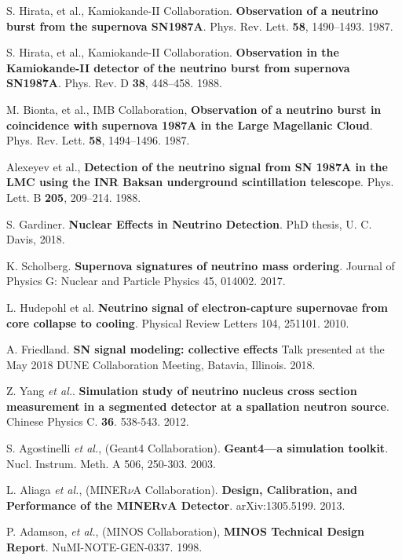  S. Hirata, et al., Kamiokande-II Collaboration. \textbf{Observation of a neutrino burst from the supernova SN1987A}. Phys. Rev. Lett. \textbf{58}, 1490–1493. 1987.

 S. Hirata, et al., Kamiokande-II Collaboration. \textbf{Observation in the Kamiokande-II detector of the neutrino burst from supernova SN1987A}. Phys. Rev. D \textbf{38}, 448–458. 1988.

 M. Bionta, et al., IMB Collaboration, \textbf{Observation of a neutrino burst in coincidence with supernova 1987A in the Large Magellanic Cloud}. Phys. Rev. Lett. \textbf{58}, 1494–1496. 1987. 

 Alexeyev et al., \textbf{Detection of the neutrino signal from SN 1987A in the LMC using the INR Baksan underground scintillation telescope}. Phys. Lett. B \textbf{205}, 209–214. 1988.

 S. Gardiner. \textbf{Nuclear Effects in Neutrino Detection}. PhD thesis,  U. C. Davis, 2018.

 K. Scholberg. \textbf{Supernova signatures of neutrino mass ordering}. Journal of Physics G: Nuclear and Particle Physics 45, 014002. 2017.

 L. Hudepohl et al. \textbf{Neutrino signal of electron-capture supernovae from core collapse to cooling}. Physical Review Letters 104, 251101. 2010.

 A. Friedland. \textbf{SN signal modeling: collective effects} Talk presented at the May 2018 DUNE Collaboration Meeting, Batavia, Illinois. 2018. 

 Z. Yang \textit{et al.}. \textbf{Simulation study of neutrino nucleus cross section measurement in a segmented detector at a spallation neutron source}. Chinese Physics C. \textbf{36}. 538-543. 2012. 


 S. Agostinelli \textit{et al.}, (Geant4 Collaboration). \textbf{Geant4—a simulation toolkit}. Nucl. Instrum. Meth. A 506, 250-303. 2003.

 L. Aliaga \textit{et al.}, (MINER$\nu$A Collaboration). \textbf{Design, Calibration, and Performance of the MINERvA Detector}.  arXiv:1305.5199. 2013. 

 P. Adamson, \textit{et al.}, (MINOS Collaboration), \textbf{MINOS Technical Design Report}. NuMI-NOTE-GEN-0337. 1998.

